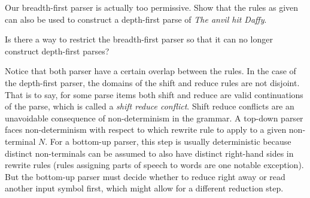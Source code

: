 \begin{exercise}
    Our breadth-first parser is actually too permissive.
    Show that the rules as given can also be used to construct a depth-first parse of \emph{The anvil hit Daffy}.
\end{exercise}
%
\begin{exercise}
    Is there a way to restrict the breadth-first parser so that it can no longer construct depth-first parses?
\end{exercise}

Notice that both parser have a certain overlap between the rules.
In the case of the depth-first parser, the domains of the shift and reduce rules are not disjoint.
That is to say, for some parse items both shift and reduce are valid continuations of the parse, which is called a \emph{shift reduce conflict}.
Shift reduce conflicts are an unavoidable consequence of non-determinism in the grammar.
A top-down parser faces non-determinism with respect to which rewrite rule to apply to a given non-terminal $N$.
For a bottom-up parser, this step is usually deterministic because distinct non-terminals can be assumed to also have distinct right-hand sides in rewrite rules (rules assigning parts of speech to words are one notable exception).
But the bottom-up parser must decide whether to reduce right away or read another input symbol first, which might allow for a different reduction step.
%
